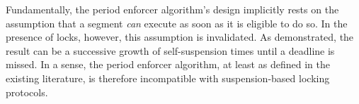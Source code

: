 Fundamentally, the period enforcer algorithm's design implicitly rests on the assumption that a segment \emph{can} execute as soon as it is eligible to do so. In the presence of locks, however, this assumption is invalidated. As demonstrated, the result can be a successive growth of self-suspension times until a deadline is missed.  In a sense, the period enforcer algorithm, at least as defined in the existing literature, is therefore incompatible with suspension-based locking protocols. 


